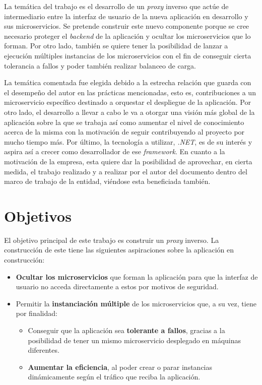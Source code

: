 \documentclass[11pt,spanish,listoffigures]{tfgetsinf}
\begin{document}
La temática del trabajo es el desarrollo de un \emph{proxy} inverso que actúe de intermediario entre la interfaz de usuario de la nueva aplicación en desarrollo y sus microservicios. Se pretende construir este nuevo componente porque se cree necesario proteger el \emph{backend} de la aplicación y ocultar los microservicios que lo forman. Por otro lado, también se quiere tener la posibilidad de lanzar a ejecución múltiples instancias de los microservicios con el fin de conseguir cierta tolerancia a fallos y poder también realizar balanceo de carga.

La temática comentada fue elegida debido a la estrecha relación que guarda con el desempeño del autor en las prácticas mencionadas, esto es, contribuciones a un microservicio específico destinado a orquestar el despliegue de la aplicación. Por otro lado, el desarrollo a llevar a cabo le va a otorgar una visión más global de la aplicación sobre la que se trabaja así como aumentar el nivel de conocimiento acerca de la misma con la motivación de seguir contribuyendo al proyecto por mucho tiempo más. Por último, la tecnología a utilizar, \emph{.NET}, es de su interés y aspira así a crecer como desarrollador de ese \emph{framework}. En cuanto a la motivación de la empresa, esta quiere dar la posibilidad de aprovechar, en cierta medida, el trabajo realizado y a realizar por el autor del documento dentro del marco de trabajo de la entidad, viéndose esta beneficiada también.

\section{Objetivos}

El objetivo principal de este trabajo es construir un \emph{proxy} inverso. La construcción de este tiene las siguientes aspiraciones sobre la aplicación en construcción:

\begin{itemize}

\item \textbf{Ocultar los microservicios} que forman la aplicación para que la interfaz de usuario no acceda directamente a estos por motivos de seguridad.

\item Permitir la \textbf{instanciación múltiple} de los microservicios que, a su vez, tiene por finalidad:
\begin{itemize}

\item Conseguir que la aplicación sea \textbf{tolerante a fallos}, gracias a la posibilidad de tener un mismo microservicio desplegado en máquinas diferentes.

\item \textbf{Aumentar la eficiencia}, al poder crear o parar instancias dinámicamente según el tráfico que reciba la aplicación.

\end{itemize}

\end{itemize}
\end{document}
